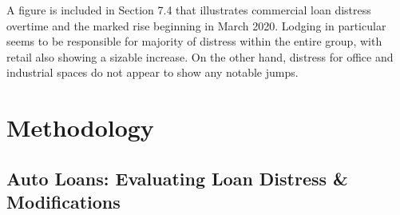 \documentclass[10.5pt]{article}
\begin{document}
A figure is included in Section 7.4 that illustrates commercial loan distress overtime and the marked rise beginning in March 2020. Lodging in particular seems to be responsible for majority of distress within the entire group, with retail also showing a sizable increase. On the other hand, distress for office and industrial spaces do not appear to show any notable jumps. 

\section{Methodology}

\subsection{Auto Loans: Evaluating Loan Distress \& Modifications}
\end{document}
